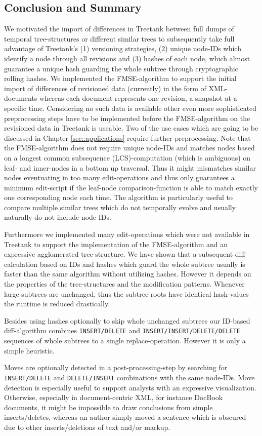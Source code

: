 \subsection{Conclusion and Summary}
We motivated the import of differences in Treetank between full dumps of temporal tree-structures or different similar trees to subsequently take full advantage of Treetank's (1) versioning strategies, (2) unique node-IDs which identify a node through all revisions and (3) hashes of each node, which almost guarantee a unique hash guarding the whole subtree through cryptographic rolling hashes. We implemented the FMSE-algorithm to support the initial import of differences of revisioned data (currently) in the form of XML-documents whereas each document represents one revision, a snapshot at a specific time. Considering no such data is available other even more sophisticated preprocessing steps have to be implemented before the FMSE-algorithm on the revisioned data in Treetank is useable. Two of the use cases which are going to be discussed in Chapter \ref{sec::applications} require further preprocessing. Note that the FMSE-algorithm does not require unique node-IDs and matches nodes based on a longest common subsequence (LCS)-computation (which is ambiguous) on leaf- and inner-nodes in a bottom up traversal. Thus it might mismatches similar nodes eventuating in too many edit-operations and thus only guarantees a minimum edit-script if the leaf-node comparison-function is able to match exactly one corresponding node each time. The algorithm is particularly useful to compare multiple similar trees which do not temporally evolve and usually naturally do not include node-IDs.

Furthermore we implemented many edit-operations which were not available in Treetank to support the implementation of the FMSE-algorithm and an expressive agglomerated tree-structure. We have shown that a subsequent diff-calculation based on IDs and hashes which guard the whole subtree usually is faster than the same algorithm without utilizing hashes. However it depends on the properties of the tree-structures and the modification patterns. Whenever large subtrees are unchanged, thus the subtree-roots have identical hash-values the runtime is reduced drastically.

Besides using hashes optionally to skip whole unchanged subtrees our ID-based diff-algorithm combines \texttt{INSERT/DELETE} and \texttt{INSERT/INSERT/DELETE/DELETE} sequences of whole subtrees to a single replace-operation. However it is only a simple heuristic.

Moves are optionally detected in a post-processing-step by searching for \texttt{INSERT/DELETE} and \texttt{DELETE/INSERT} combinations with the same node-IDs. Move detection is especially useful to support analysts with an expressive visualization. Otherwise, especially in document-centric XML, for instance DocBook\cite{docbook} documents, it might be impossible to draw conclusions from simple inserts/deletes, whereas an author simply moved a sentence which is obscured due to other inserts/deletions of text and/or markup.
